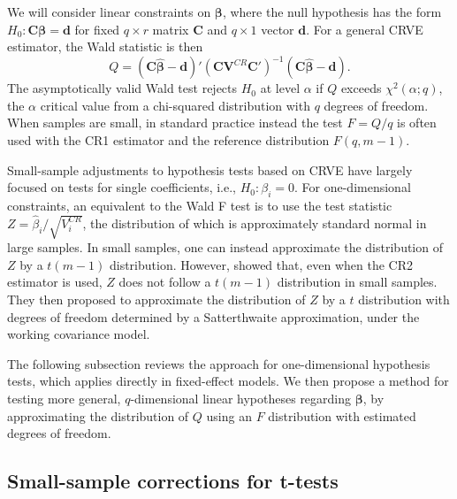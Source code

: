 \documentclass[12pt]{article}\usepackage[]{graphicx}\usepackage[]{color}
\newcommand{\bm}{\mathbf}
\newcommand{\bs}{\boldsymbol}
\begin{document}
We will consider linear constraints on $\bs\beta$, where the null hypothesis has the form $H_0: \bm{C}\bs\beta = \bm{d}$ for fixed $q \times r$ matrix $\bm{C}$ and $q \times 1$ vector $\bm{d}$. 
For a general CRVE estimator, the Wald statistic  is then
\begin{equation}
\label{eq:Wald_stat}
Q = \left(\bm{C}\bs{\hat\beta} - \bm{d}\right)'\left(\bm{C} \bm{V}^{CR} \bm{C}'\right)^{-1}\left(\bm{C}\bs{\hat\beta} - \bm{d}\right).
\end{equation}
The asymptotically valid Wald test rejects $H_0$ at level $\alpha$ if $Q$ exceeds $\chi^2(\alpha; q)$, the $\alpha$ critical value from a chi-squared distribution with $q$ degrees of freedom.  When samples are small, in standard practice instead the test $F = Q/q$ is often used with the CR1 estimator and the reference distribution $F(q, m - 1)$. 

Small-sample adjustments to hypothesis tests based on CRVE have largely focused on tests for single coefficients, i.e., $H_0: \beta_i = 0$. 
For one-dimensional constraints, an equivalent to the Wald F test is to use the test statistic $Z = \hat\beta_i / \sqrt{V_i^{CR}}$, the distribution of which is approximately standard normal in large samples. 
In small samples, one can instead approximate the distribution of $Z$ by a $t(m - 1)$ distribution. 
However, \citet{Bell2002bias} showed that, even when the CR2 estimator is used, $Z$ does not follow a $t(m - 1)$ distribution in small samples. 
They then proposed to approximate the distribution of $Z$ by a $t$ distribution with degrees of freedom determined by a Satterthwaite approximation, under the working covariance model.

The following subsection reviews the \citet{Bell2002bias} approach for one-dimensional hypothesis tests, which applies directly in fixed-effect models. 
We then propose a method for testing more general, $q$-dimensional linear hypotheses regarding $\bs\beta$, by approximating the distribution of $Q$ using an $F$ distribution with estimated degrees of freedom.

\subsection{Small-sample corrections for t-tests}
\end{document}
